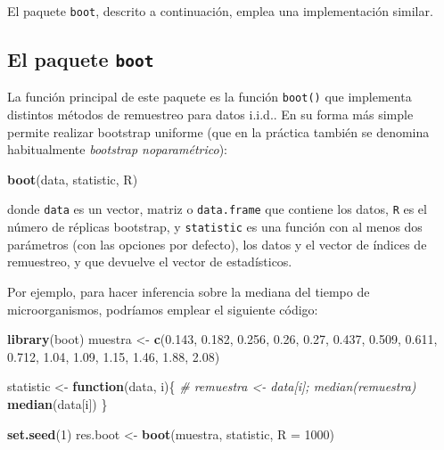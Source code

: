 \documentclass[
]{book}
\newenvironment{Shaded}{\begin{snugshade}}{\end{snugshade}}
\newcommand{\CommentTok}[1]{\textcolor[rgb]{0.56,0.35,0.01}{\textit{#1}}}
\newcommand{\ControlFlowTok}[1]{\textcolor[rgb]{0.13,0.29,0.53}{\textbf{#1}}}
\newcommand{\DataTypeTok}[1]{\textcolor[rgb]{0.13,0.29,0.53}{#1}}
\newcommand{\DecValTok}[1]{\textcolor[rgb]{0.00,0.00,0.81}{#1}}
\newcommand{\FloatTok}[1]{\textcolor[rgb]{0.00,0.00,0.81}{#1}}
\newcommand{\KeywordTok}[1]{\textcolor[rgb]{0.13,0.29,0.53}{\textbf{#1}}}
\newcommand{\NormalTok}[1]{#1}
\newcommand{\StringTok}[1]{\textcolor[rgb]{0.31,0.60,0.02}{#1}}
\theoremstyle{break}
\theoremstyle{definition}
\theoremstyle{definition}
\theoremstyle{definition}
\theoremstyle{remark}
\begin{document}
El paquete \texttt{boot}, descrito a continuación, emplea una implementación similar.

\hypertarget{intro-pkgboot}{%
\subsection{\texorpdfstring{El paquete \texttt{boot}}{El paquete boot}}\label{intro-pkgboot}}

La función principal de este paquete es la función \texttt{boot()} que implementa distintos métodos de remuestreo para datos i.i.d..
En su forma más simple permite realizar bootstrap uniforme (que en la práctica también se denomina habitualmente \emph{bootstrap noparamétrico}):

\begin{Shaded}
\begin{Highlighting}[]
\KeywordTok{boot}\NormalTok{(data, statistic, R)}
\end{Highlighting}
\end{Shaded}

donde \texttt{data} es un vector, matriz o \texttt{data.frame} que contiene los datos,
\texttt{R} es el número de réplicas bootstrap, y \texttt{statistic} es una función
con al menos dos parámetros (con las opciones por defecto),
los datos y el vector de índices de remuestreo,
y que devuelve el vector de estadísticos.

Por ejemplo, para hacer inferencia sobre la mediana del tiempo de microorganismos,
podríamos emplear el siguiente código:

\begin{Shaded}
\begin{Highlighting}[]
\KeywordTok{library}\NormalTok{(boot)}
\NormalTok{muestra <-}\StringTok{ }\KeywordTok{c}\NormalTok{(}\FloatTok{0.143}\NormalTok{, }\FloatTok{0.182}\NormalTok{, }\FloatTok{0.256}\NormalTok{, }\FloatTok{0.26}\NormalTok{, }\FloatTok{0.27}\NormalTok{, }\FloatTok{0.437}\NormalTok{, }\FloatTok{0.509}\NormalTok{, }
             \FloatTok{0.611}\NormalTok{, }\FloatTok{0.712}\NormalTok{, }\FloatTok{1.04}\NormalTok{, }\FloatTok{1.09}\NormalTok{, }\FloatTok{1.15}\NormalTok{, }\FloatTok{1.46}\NormalTok{, }\FloatTok{1.88}\NormalTok{, }\FloatTok{2.08}\NormalTok{)}

\NormalTok{statistic <-}\StringTok{ }\ControlFlowTok{function}\NormalTok{(data, i)\{}
  \CommentTok{# remuestra <- data[i]; median(remuestra)}
  \KeywordTok{median}\NormalTok{(data[i])}
\NormalTok{\}}

\KeywordTok{set.seed}\NormalTok{(}\DecValTok{1}\NormalTok{)}
\NormalTok{res.boot <-}\StringTok{ }\KeywordTok{boot}\NormalTok{(muestra, statistic, }\DataTypeTok{R =} \DecValTok{1000}\NormalTok{)}
\end{Highlighting}
\end{Shaded}
\end{document}
